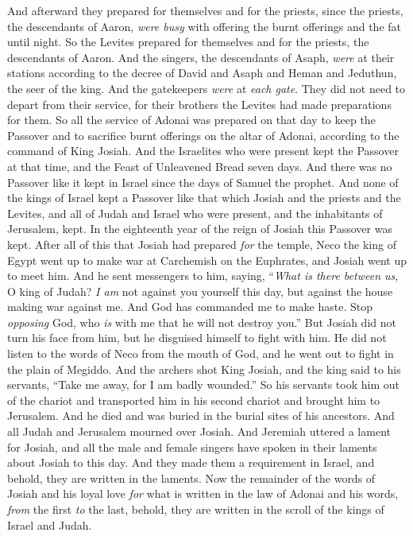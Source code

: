 \begin{biblechapter}
\verse And afterward they prepared for themselves and for the priests, since the priests, the descendants of Aaron, \textit{were busy} with offering the burnt offerings and the fat until night. So the Levites prepared for themselves and for the priests, the descendants of Aaron.
\verse And the singers, the descendants of Asaph, \textit{were} at their stations according to the decree of David and Asaph and Heman and Jeduthun, the seer of the king. And the gatekeepers \textit{were} at \textit{each gate}. They did not need to depart from their service, for their brothers the Levites had made preparations for them.
\verse So all the service of Adonai was prepared on that day to keep the Passover and to sacrifice burnt offerings on the altar of Adonai, according to the command of King Josiah.
\verse And the Israelites who were present kept the Passover at that time, and the Feast of Unleavened Bread seven days.
\verse And there was no Passover like it kept in Israel since the days of Samuel the prophet. And none of the kings of Israel kept a Passover like that which Josiah and the priests and the Levites, and all of Judah and Israel who were present, and the inhabitants of Jerusalem, kept.
\verse In the eighteenth year of the reign of Josiah this Passover was kept.
 After all of this that Josiah had prepared \textit{for} the temple, Neco the king of Egypt went up to make war at Carchemish on the Euphrates, and Josiah went up to meet him.
\verse And he sent messengers to him, saying, “\textit{What is there between us}, O king of Judah? \textit{I am} not against you yourself this day, but against the house making war against me. And God has commanded me to make haste. Stop \textit{opposing} God, who \textit{is} with me that he will not destroy you.”
\verse But Josiah did not turn his face from him, but he disguised himself to fight with him. He did not listen to the words of Neco from the mouth of God, and he went out to fight in the plain of Megiddo.
\verse And the archers shot King Josiah, and the king said to his servants, “Take me away, for I am badly wounded.”
\verse So his servants took him out of the chariot and transported him in his second chariot and brought him to Jerusalem. And he died and was buried in the burial sites of his ancestors. And all Judah and Jerusalem mourned over Josiah.
\verse And Jeremiah uttered a lament for Josiah, and all the male and female singers have spoken in their laments about Josiah to this day. And they made them a requirement in Israel, and behold, they are written in the laments.
\verse Now the remainder of the words of Josiah and his loyal love \textit{for} what is written in the law of Adonai
\verse and his words, \textit{from} the first \textit{to} the last, behold, they are written in the scroll of the kings of Israel and Judah.
\end{biblechapter}

